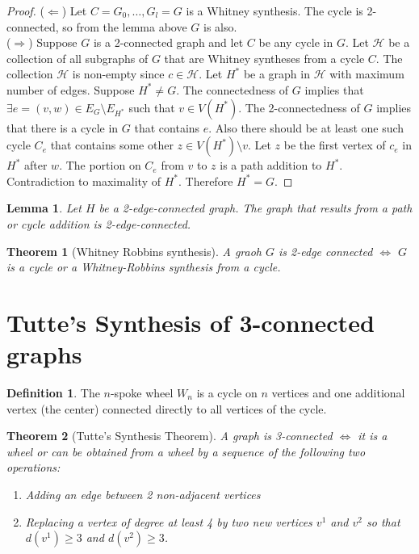 \documentclass{article}
\newtheorem*{thm}{Theorem}
\newtheorem*{lem}{Lemma}
\theoremstyle{definition}
\newtheorem*{defn}{Definition}
\begin{document}
\begin{proof}
($\Leftarrow$) Let $C=G_0,\ldots,G_l=G$ is a Whitney synthesis.
The cycle is 2-connected, so from the lemma above $G$ is also.\\
($\Rightarrow$) Suppose $G$ is a 2-connected graph and let $C$ be any cycle in $G$.
Let $\mathcal{H}$ be a collection of all subgraphs of $G$ that are Whitney syntheses from a cycle $C$.
The collection $\mathcal{H}$ is non-empty since $c\in\mathcal{H}$.
Let $H^*$ be a graph in $\mathcal{H}$ with maximum number of edges.
Suppose $H^*\ne G$.
The connectedness of $G$ implies that $\exists e=(v,w)\in E_G\setminus E_{H^*}$ such that $v\in V(H^*)$.
The 2-connectedness of $G$ implies that there is a cycle in $G$ that contains $e$.
Also there should be at least one such cycle $C_e$ that contains some other $z\in V(H^*)\setminus v$.
Let $z$ be the first vertex of $c_e$ in $H^*$ after $w$.
The portion on $C_e$ from $v$ to $z$ is a path addition to $H^*$.
Contradiction to maximality of $H^*$.
Therefore $H^* = G$.
\end{proof}

\begin{lem}
Let $H$ be a 2-edge-connected graph.
The graph that results from a path or cycle addition is 2-edge-connected.
\end{lem}

\begin{thm}[Whitney Robbins synthesis]
A graoh $G$ is 2-edge connected $\iff$ $G$ is a cycle or a Whitney-Robbins synthesis from a cycle.
\end{thm}

\section{Tutte's Synthesis of 3-connected graphs}
\begin{defn}
The $n$-spoke wheel $W_n$ is a cycle on $n$ vertices and one additional vertex (the center) connected directly to all vertices of the cycle.
\end{defn}

\begin{thm}[Tutte's Synthesis Theorem]
A graph is 3-connected $\iff$ it is a wheel or can be obtained from a wheel by a sequence of the following two operations:
\begin{enumerate}
\item Adding an edge between 2 non-adjacent vertices
\item Replacing a vertex of degree at least 4 by two new vertices $v^1$ and $v^2$ so that $d(v^1) \ge 3$ and $d(v^2)\ge 3$.
\end{enumerate}
\end{thm}
\end{document}

